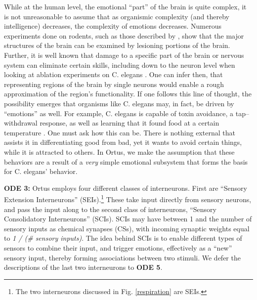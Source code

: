 \documentclass[letterpaper]{article}
\begin{document}
While at the human level, the emotional ``part'' of the brain is quite complex, it is not unreasonable to assume that as organismic complexity (and thereby intelligence) decreases, the complexity of emotions decreases. Numerous experiments done on rodents, such as those described by \citet{Weiner2015}, show that the major structures of the brain can be examined by lesioning portions of the brain. Further, it is well known that damage to a specific part of the brain or nervous system can eliminate certain skills, including down to the neuron level when looking at ablation experiments on C. elegans \citep{Fang-Yen2012}. One can infer then, that representing regions of the brain by single neurons would enable a rough approximation of the region's functionality. If one follows this line of thought, the possibility emerges that organisms like C. elegans may, in fact, be driven by ``emotions'' as well. For example, C. elegans is capable of toxin avoidance, a tap--withdrawal response, as well as learning that it found food at a certain temperature \citep{Wicks1996,Xu2012}. One must ask how this can be. There is nothing external that assists it in differentiating good from bad, yet it wants to avoid certain things, while it is attracted to others. In Ortus, we make the assumption that these behaviors are a result of a \textit{very} simple emotional subsystem that forms the basis for C. elegans' behavior.


\textbf{ODE 3:} Ortus employs four different classes of interneurons. First are ``Sensory Extension Interneurons'' (SEIs).\footnote{The two interneurons discussed in Fig. \ref{respiration} are SEIs.} These take input directly from sensory neurons, and pass the input along to the second class of interneurons, ``Sensory Consolidatory Interneurons'' (SCIs).
SCIs may have between 1 and the number of sensory inputs as chemical synapses (CSs), with incoming synaptic weights equal to \textit{1 / (\# sensory inputs)}.
The idea behind SCIs is to enable different types of sensors to combine their input, and trigger emotions, effectively as a ``new'' sensory input, thereby forming associations between two stimuli. We defer the descriptions of the last two interneurons to \textbf{ODE 5}.
\end{document}
